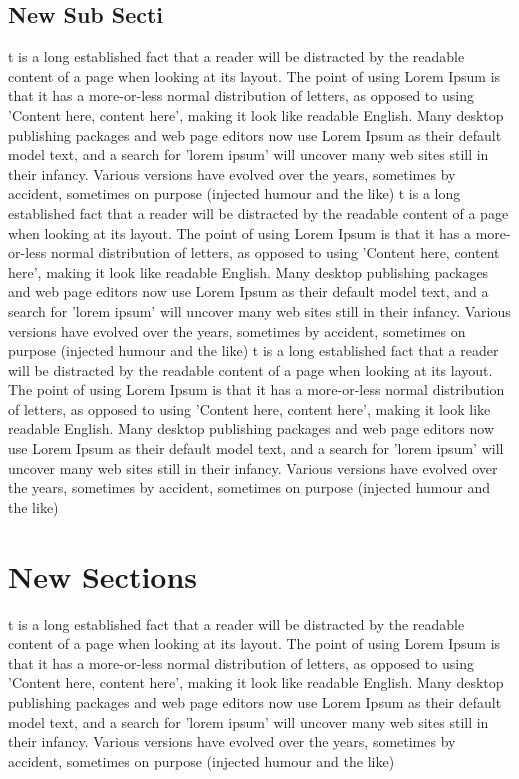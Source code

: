 \documentclass[]{article}
\begin{document}
\subsection{New Sub Secti}
t is a long established fact that a reader will be distracted by the readable content of a page when looking at its layout. The point of using Lorem Ipsum is that it has a more-or-less normal distribution of letters, as opposed to using 'Content here, content here', making it look like readable English. Many desktop publishing packages and web page editors now use Lorem Ipsum as their default model text, and a search for 'lorem ipsum' will uncover many web sites still in their infancy. Various versions have evolved over the years, sometimes by accident, sometimes on purpose (injected humour and the like)
t is a long established fact that a reader will be distracted by the readable content of a page when looking at its layout. The point of using Lorem Ipsum is that it has a more-or-less normal distribution of letters, as opposed to using 'Content here, content here', making it look like readable English. Many desktop publishing packages and web page editors now use Lorem Ipsum as their default model text, and a search for 'lorem ipsum' will uncover many web sites still in their infancy. Various versions have evolved over the years, sometimes by accident, sometimes on purpose (injected humour and the like)
t is a long established fact that a reader will be distracted by the readable content of a page when looking at its layout. The point of using Lorem Ipsum is that it has a more-or-less normal distribution of letters, as opposed to using 'Content here, content here', making it look like readable English. Many desktop publishing packages and web page editors now use Lorem Ipsum as their default model text, and a search for 'lorem ipsum' will uncover many web sites still in their infancy. Various versions have evolved over the years, sometimes by accident, sometimes on purpose (injected humour and the like)

\section{New Sections}
t is a long established fact that a reader will be distracted by the readable content of a page when looking at its layout. The point of using Lorem Ipsum is that it has a more-or-less normal distribution of letters, as opposed to using 'Content here, content here', making it look like readable English. Many desktop publishing packages and web page editors now use Lorem Ipsum as their default model text, and a search for 'lorem ipsum' will uncover many web sites still in their infancy. Various versions have evolved over the years, sometimes by accident, sometimes on purpose (injected humour and the like)
\end{document}
